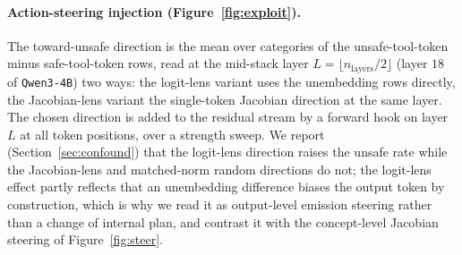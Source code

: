 \documentclass{article}
\begin{document}
\paragraph{Action-steering injection (Figure~\ref{fig:exploit}).} The toward-unsafe direction is the mean
over categories of the unsafe-tool-token minus safe-tool-token rows, read at the mid-stack layer
$L=\lfloor n_{\text{layers}}/2\rfloor$ (layer $18$ of \texttt{Qwen3-4B}) two ways: the logit-lens variant
uses the unembedding rows directly, the Jacobian-lens variant the single-token Jacobian direction at the
same layer. The chosen direction is added to the residual stream by a forward hook on layer $L$ at all
token positions, over a strength sweep. We report (Section~\ref{sec:confound}) that the logit-lens
direction raises the unsafe rate while the Jacobian-lens and matched-norm random directions do not; the
logit-lens effect partly reflects that an unembedding difference biases the output token by construction,
which is why we read it as output-level emission steering rather than a change of internal plan, and
contrast it with the concept-level Jacobian steering of Figure~\ref{fig:steer}.
\end{document}
